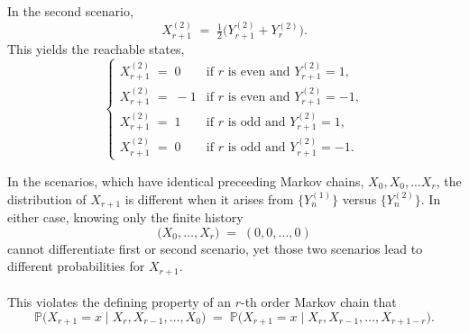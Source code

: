 \documentclass{article}
\begin{document}
\begin{enumerate}
{\begin{itemize}
  In the second scenario, 
  \[
    X^{(2)}_{r+1}
    \;=\;\tfrac12\bigl(Y^{(2)}_{r+1} + Y^{(2)}_r\bigr).
  \]
  This yields the reachable states, 
  \[
    \begin{cases}
      X_{r+1}^{(2)} \;=\;0 
      & \text{if } r \text{ is even and } Y_{r+1}^{(2)}=1,\\[0.5em]
      X_{r+1}^{(2)} \;=\;-1 
      & \text{if } r \text{ is even and } Y_{r+1}^{(2)}=-1,\\[0.5em]
      X_{r+1}^{(2)} \;=\;1 
      & \text{if } r \text{ is odd and } Y_{r+1}^{(2)}=1,\\[0.5em]
      X_{r+1}^{(2)} \;=\;0
      & \text{if } r \text{ is odd and } Y_{r+1}^{(2)}=-1.
    \end{cases}
  \]
\end{itemize}
In the scenarios, which have identical preceeding Markov chains, $X_0, X_0,...X_r$, the distribution of \(X_{r+1}\) is different when it arises from \(\{Y_n^{(1)}\}\) versus \(\{Y^{(2)}_n\}\).
In either case, knowing only the finite history
\[
   \bigl(X_0,\dots, X_r\bigr) \;=\; (0,0,\dots,0)
\]
cannot differentiate first or second scenario, yet those two scenarios lead to different probabilities for \(X_{r+1}\). \\ \\
This violates the defining property of an \(r\)-th order Markov chain that
\[
   \mathbb{P}\bigl(X_{r+1} = x \;\bigl|\; X_r, X_{r-1},\dots, X_0\bigr)
   \;=\;
   \mathbb{P}\bigl(X_{r+1} = x \;\bigl|\; X_r, X_{r-1},\dots, X_{r+1-r}\bigr).
\]}
\end{enumerate}
\end{document}

